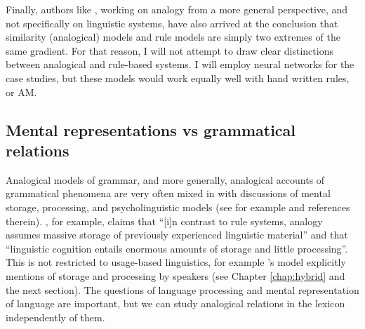 Finally, authors like \textcite{Pothos.2005}, working on analogy from a more general perspective, and not specifically on linguistic systems, have also arrived at the conclusion that similarity (analogical) models and rule models are simply two extremes of the same gradient. For that reason, I will not attempt to draw clear distinctions between analogical and rule-based systems. I will employ neural networks for the case studies, but these models would work equally well with hand written rules, or AM.


\subsection{Mental representations vs grammatical relations}

Analogical models of grammar, and more generally, analogical accounts of grammatical phenomena are very often mixed in with discussions of mental storage, processing, and psycholinguistic models (see for example \cite{Bybee.2010} and references therein). \textcite[p. 419-420]{Eddington.2009}, for example, claims that ``[i]n contrast to rule systems, analogy assumes massive storage of previously experienced linguistic material'' and that ``linguistic cognition entails enormous amounts of storage and little processing''. This is not restricted to usage-based linguistics, for example \citet{Gouskova.2015}'s model explicitly mentions of storage and processing by speakers (see Chapter \ref{chap:hybrid} and the next section). The questions of language processing and mental representation of language are important, but we can study analogical relations in the lexicon independently of them.

